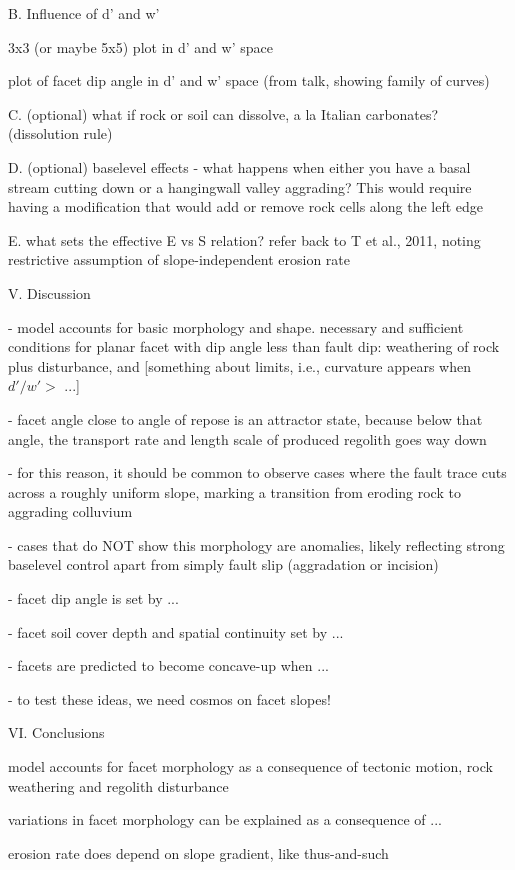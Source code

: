 B. Influence of d' and w'

3x3 (or maybe 5x5) plot in d' and w' space

plot of facet dip angle in d' and w' space (from talk, showing family of curves)

C. (optional) what if rock or soil can dissolve, a la Italian carbonates? (dissolution rule)

D. (optional) baselevel effects - what happens when either you have a basal stream cutting down or a hangingwall valley aggrading? This would require having a modification that would add or remove rock cells along the left edge

E. what sets the effective E vs S relation? refer back to T et al., 2011, noting restrictive assumption of slope-independent erosion rate


V. Discussion

- model accounts for basic morphology and shape. necessary and sufficient conditions for planar facet with dip angle less than fault dip: weathering of rock plus disturbance, and [something about limits, i.e., curvature appears when $d'/w' >$ ...]

- facet angle close to angle of repose is an attractor state, because below that angle, the transport rate and length scale of produced regolith goes way down

- for this reason, it should be common to observe cases where the fault trace cuts across a roughly uniform slope, marking a transition from eroding rock to aggrading colluvium

- cases that do NOT show this morphology are anomalies, likely reflecting strong baselevel control apart from simply fault slip (aggradation or incision)

- facet dip angle is set by ...

- facet soil cover depth and spatial continuity set by ...

- facets are predicted to become concave-up when ...

- to test these ideas, we need cosmos on facet slopes!


VI. Conclusions

model accounts for facet morphology as a consequence of tectonic motion, rock weathering and regolith disturbance

variations in facet morphology can be explained as a consequence of ...

erosion rate does depend on slope gradient, like thus-and-such

